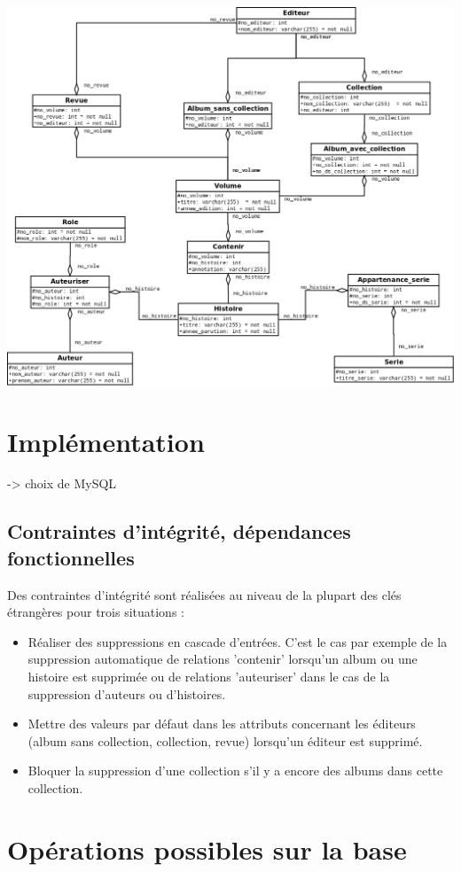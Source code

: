 \documentclass[12pt]{article}
\begin{document}
\noindent\includegraphics[width=\textwidth]{schema-relation}

\section{Implémentation }
-> choix de MySQL

\subsection{Contraintes d'intégrité, dépendances fonctionnelles}

Des contraintes d'intégrité sont réalisées au niveau de la plupart des clés
étrangères pour trois situations : 
\begin{itemize}
	\item Réaliser des suppressions en cascade d'entrées. C'est le cas par
		exemple de la suppression automatique de relations 'contenir'
		lorsqu'un album ou une histoire est supprimée ou de relations
		'auteuriser' dans le cas de la suppression d'auteurs ou d'histoires.
	\item Mettre des valeurs par défaut dans les attributs concernant les
		éditeurs (album sans collection, collection, revue) lorsqu'un éditeur
		est supprimé.
	\item Bloquer la suppression d'une collection s'il y
		a encore des albums dans cette collection.
\end{itemize}

\section{Opérations possibles sur la base}
\end{document}

